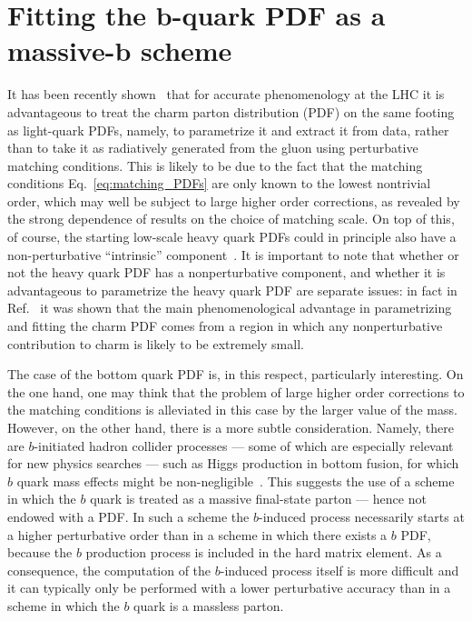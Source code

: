 \chapter{Fitting the b-quark PDF as a massive-b scheme}
\label{ch:bottom}

It has been recently shown~\cite{Ball:2017nwa} that for accurate
phenomenology at the LHC it is advantageous to treat the charm parton
distribution (PDF) on the same footing as light-quark PDFs, namely, to
parametrize it and extract it from data, rather than to take it
as radiatively generated from the gluon using  perturbative matching
conditions. This is likely to be
due to the fact that the matching conditions Eq.~\eqref{eq:matching_PDFs} are only known to
the lowest nontrivial order, which may well be subject to large higher
order
corrections, as revealed by the strong dependence of results on the
choice of matching scale. On top of this, of course,
the starting low-scale heavy quark
PDFs could in principle also have a
non-perturbative ``intrinsic''
component~\cite{Brodsky:1980pb,PhysRevD.23.2745}. It is important to note  that
whether or not the heavy quark PDF has a nonperturbative component,
and whether it is advantageous to parametrize the heavy quark PDF are
separate issues: in fact in Ref.~\cite{Ball:2017nwa} it was shown that
the main phenomenological
advantage in parametrizing and fitting the charm PDF comes from a region in
which any nonperturbative contribution to charm is likely to be
extremely small. 

The case of the bottom quark PDF is, in this respect, particularly
interesting. On the one hand, one may think that the problem of
large higher order corrections to the matching conditions is alleviated
in this case by the larger value of the mass. However, on the other
hand, there is a more subtle consideration. Namely, there are $b$-initiated
hadron collider processes --- some of which
are especially relevant for new physics searches --- such as Higgs production in
bottom fusion, for which $b$ quark mass effects might be
non-negligible~\cite{Maltoni:2012pa,Lim:2016wjo,Bagnaschi:2018dnh}. This
suggests the use of a scheme in which the $b$ quark is
treated as a 
massive final-state parton --- hence not endowed with a
PDF. In such a scheme
the $b$-induced process necessarily
starts at a higher perturbative order than in  a scheme in which
there exists a $b$ PDF, because the $b$ production process is included in the
hard matrix element. As a consequence, the computation of the
$b$-induced process itself is more difficult and it can typically
only be performed with a lower perturbative accuracy than in a scheme
in which the $b$ quark is a massless parton.


